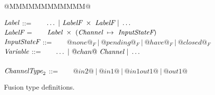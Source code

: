
\begin{figure}

\begin{tabbing}
@MMMMMMMMMMMM@   \TABDEF \kill

$\textit{Label}$        \> ::=  \> ~~~ $\ldots ~|~\textit{LabelF}~\times~\textit{LabelF} ~|~ \ldots$ \\
$\textit{LabelF}$      \> =    \> ~~~ $\textit{Label}~\times~(\textit{Channel} ~\mapsto~ \textit{InputStateF})$  \\
$\textit{InputStateF}$ \> ::=  \> ~~~ $@none@_F ~|~ @pending@_F ~|~ @have@_F ~|~ @closed@_F$    \\
$\textit{Variable}$          \> ::=  \> ~~~ $\ldots ~|~@chan@~\textit{Channel} ~|~ \ldots$ \\
\\

$\textit{ChannelType}_2$   \> ::=  \> ~~~ $@in2@~|~@in1@~|~@in1out1@~|~@out1@$
\end{tabbing}

\caption{Fusion type definitions.}
\label{fig:Fusion:Types}
\end{figure}


